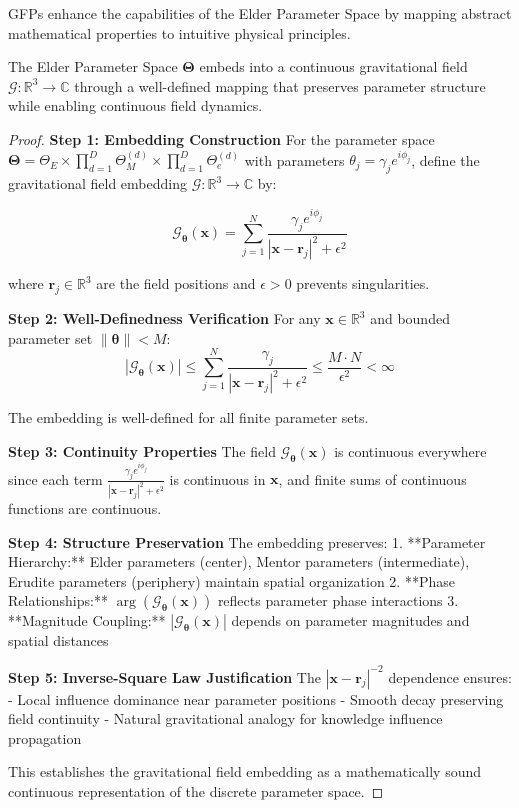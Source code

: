 GFPs enhance the capabilities of the Elder Parameter Space by mapping abstract mathematical properties to intuitive physical principles.

\begin{theorem}
\label{thm:gravitational_field_embedding}
The Elder Parameter Space $\boldsymbol{\Theta}$ embeds into a continuous gravitational field $\mathcal{G}: \mathbb{R}^3 \rightarrow \mathbb{C}$ through a well-defined mapping that preserves parameter structure while enabling continuous field dynamics.
\end{theorem}

\begin{proof}
\textbf{Step 1: Embedding Construction}
For the parameter space $\boldsymbol{\Theta} = \Theta_E \times \prod_{d=1}^D \Theta_M^{(d)} \times \prod_{d=1}^D \Theta_e^{(d)}$ with parameters $\theta_j = \gamma_j e^{i\phi_j}$, define the gravitational field embedding $\mathcal{G}: \mathbb{R}^3 \rightarrow \mathbb{C}$ by:

$$\mathcal{G}_{\boldsymbol{\theta}}(\mathbf{x}) = \sum_{j=1}^N \frac{\gamma_j e^{i\phi_j}}{|\mathbf{x} - \mathbf{r}_j|^2 + \epsilon^2}$$

where $\mathbf{r}_j \in \mathbb{R}^3$ are the field positions and $\epsilon > 0$ prevents singularities.

\textbf{Step 2: Well-Definedness Verification}
For any $\mathbf{x} \in \mathbb{R}^3$ and bounded parameter set $\|\boldsymbol{\theta}\| < M$:
$$|\mathcal{G}_{\boldsymbol{\theta}}(\mathbf{x})| \leq \sum_{j=1}^N \frac{\gamma_j}{|\mathbf{x} - \mathbf{r}_j|^2 + \epsilon^2} \leq \frac{M \cdot N}{\epsilon^2} < \infty$$

The embedding is well-defined for all finite parameter sets.

\textbf{Step 3: Continuity Properties}
The field $\mathcal{G}_{\boldsymbol{\theta}}(\mathbf{x})$ is continuous everywhere since each term $\frac{\gamma_j e^{i\phi_j}}{|\mathbf{x} - \mathbf{r}_j|^2 + \epsilon^2}$ is continuous in $\mathbf{x}$, and finite sums of continuous functions are continuous.

\textbf{Step 4: Structure Preservation}
The embedding preserves:
1. **Parameter Hierarchy:** Elder parameters (center), Mentor parameters (intermediate), Erudite parameters (periphery) maintain spatial organization
2. **Phase Relationships:** $\arg(\mathcal{G}_{\boldsymbol{\theta}}(\mathbf{x}))$ reflects parameter phase interactions
3. **Magnitude Coupling:** $|\mathcal{G}_{\boldsymbol{\theta}}(\mathbf{x})|$ depends on parameter magnitudes and spatial distances

\textbf{Step 5: Inverse-Square Law Justification}
The $|\mathbf{x} - \mathbf{r}_j|^{-2}$ dependence ensures:
- Local influence dominance near parameter positions
- Smooth decay preserving field continuity
- Natural gravitational analogy for knowledge influence propagation

This establishes the gravitational field embedding as a mathematically sound continuous representation of the discrete parameter space.
\end{proof}

